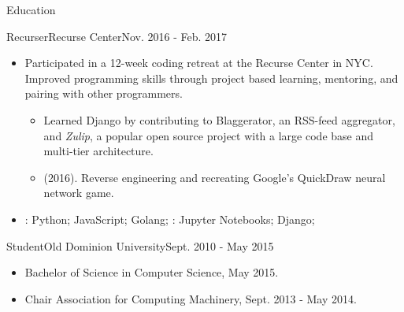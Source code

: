\documentclass[]{mcdowellcv}
\begin{document}
    \begin{cvsection}{Education}
        \begin{cvsubsection}{Recurser}{Recurse Center}{Nov. 2016 - Feb. 2017}
            \begin{itemize}
                \item Participated in a 12-week coding retreat at the Recurse Center in NYC.\newline 
                Improved programming skills through project based learning, mentoring, and pairing with other programmers.
                \begin{itemize}
                    \item Learned Django by contributing to Blaggerator, an RSS-feed aggregator, and \textit{Zulip}, a popular open source project with a large code base and multi-tier architecture.
                    \item {} (2016). Reverse engineering and recreating Google's QuickDraw neural network game.
                \end{itemize}
            \end{itemize}
            \begin{itemize}
                 \item {}: Python; JavaScript; Golang; : Jupyter Notebooks; Django;
            \end{itemize}
        \end{cvsubsection}
        \begin{cvsubsection}{Student}{Old Dominion University}{Sept. 2010 - May 2015}
            \begin{itemize}
                \item Bachelor of Science in Computer Science, May 2015.
                \item Chair Association for Computing Machinery, Sept. 2013 - May 2014.
            \end{itemize}
        \end{cvsubsection}
    \end{cvsection}
\end{document}
